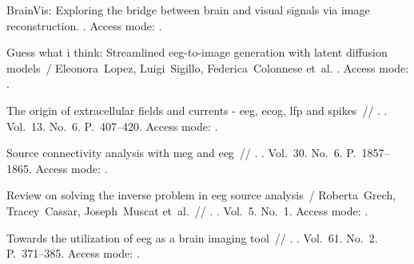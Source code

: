 \expandafter\long\expandafter\gdef\csname fullcite@10.48550/arxiv.2312.14871\endcsname{%
 BrainVis: Exploring the bridge
  between brain and visual signals via image reconstruction. \BibDash
{}. \BibDash
\newblock Access mode: .
}

\expandafter\long\expandafter\gdef\csname fullcite@10.48550/arxiv.2410.02780\endcsname{%
Guess what i think: Streamlined eeg-to-image generation with latent diffusion
  models~/ Eleonora~Lopez, Luigi~Sigillo, Federica~Colonnese et~al.
  \BibDash
{}. \BibDash
\newblock Access mode: .
}

\expandafter\long\expandafter\gdef\csname fullcite@10.1038/nrn3241\endcsname{%
 The origin of extracellular
  fields and currents - eeg, ecog, lfp and spikes~//
  \href{http://dx.doi.org/10.1038/nrn3241}{}. \BibDash
{}. \BibDash
\newblock Vol.~13. No.~6. \BibDash
\newblock P.~407--420. \BibDash
\newblock Access mode: .
}

\expandafter\long\expandafter\gdef\csname fullcite@10.1002/hbm.20745\endcsname{%
 Source connectivity analysis with meg and
  eeg~// \href{http://dx.doi.org/10.1002/hbm.20745}{}. \BibDash
{}. \BibDash
\newblock Vol.~30. No.~6. \BibDash
\newblock P.~1857--1865. \BibDash
\newblock Access mode: .
}

\expandafter\long\expandafter\gdef\csname fullcite@10.1186/1743-0003-5-25\endcsname{%
Review on solving the inverse problem in eeg source analysis~/ Roberta~Grech,
  Tracey~Cassar, Joseph~Muscat et~al.~//
  \href{http://dx.doi.org/10.1186/1743-0003-5-25}{}. \BibDash
{}. \BibDash
\newblock Vol.~5. No.~1. \BibDash
\newblock Access mode: .
}

\expandafter\long\expandafter\gdef\csname fullcite@10.1016/j.neuroimage.2011.12.039\endcsname{%
 Towards the utilization of eeg as a brain
  imaging tool~//
  \href{http://dx.doi.org/10.1016/j.neuroimage.2011.12.039}{}.
  \BibDash
{}. \BibDash
\newblock Vol.~61. No.~2. \BibDash
\newblock P.~371--385. \BibDash
\newblock Access mode:
  .
}

